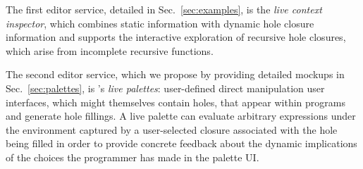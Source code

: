 The first editor service, detailed in Sec.~\ref{sec:examples}, is the \Hazel \emph{live context inspector}, which combines static information with dynamic hole closure information and supports the interactive exploration of recursive hole closures, which arise from incomplete recursive functions. 

The second editor service, which we propose by providing detailed mockups in Sec.~\ref{sec:palettes}, is \Hazel's \emph{live palettes}: user-defined direct manipulation user interfaces, which might themselves contain holes, that appear within
\Hazel programs and generate hole fillings. 
A live palette can evaluate arbitrary expressions under the environment captured by a user-selected closure associated with the hole being filled in order to provide concrete feedback
about the dynamic implications of the choices the programmer has made in the palette UI. 